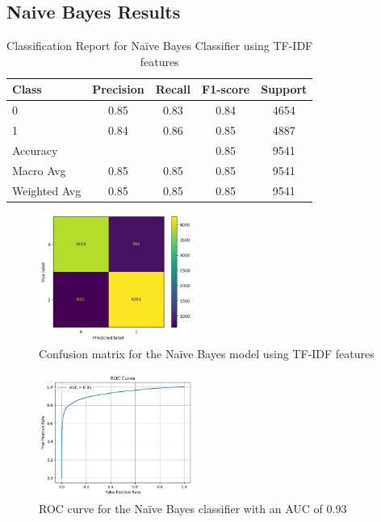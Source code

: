 \subsection{Naive Bayes Results}

\begin{table}[H]
\centering
\caption{Classification Report for Naïve Bayes Classifier using TF-IDF features}
\label{tab:nb_classification_report}
\begin{tabular}{lcccc}
\toprule
Class        & Precision & Recall & F1-score & Support \\
\midrule
0            & 0.85      & 0.83   & 0.84     & 4654    \\
1            & 0.84      & 0.86   & 0.85     & 4887    \\
\midrule
Accuracy     &           &        & 0.85     & 9541    \\
Macro Avg    & 0.85      & 0.85   & 0.85     & 9541    \\
Weighted Avg & 0.85      & 0.85   & 0.85     & 9541    \\
\bottomrule
\end{tabular}
\end{table}

\begin{figure}[H]
    \centering
    \includegraphics[width=0.45\textwidth]{images/confusion_matrix_nb.png}
    \caption{Confusion matrix for the Naïve Bayes model using TF-IDF features}
    \label{fig:confusion_nb}
\end{figure}

\begin{figure}[H]
    \centering
    \includegraphics[width=0.45\textwidth]{images/roc_curve_nb.png}
    \caption{ROC curve for the Naïve Bayes classifier with an AUC of 0.93}
    \label{fig:roc_nb}
\end{figure}

